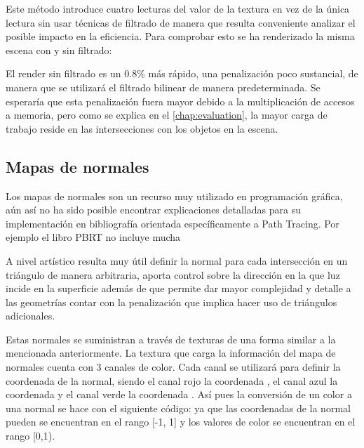 Este método introduce cuatro lecturas del valor de la textura en vez de la única lectura sin usar técnicas de filtrado de manera que resulta conveniente analizar el posible impacto en la eficiencia. Para comprobar esto se ha renderizado la misma escena con y sin filtrado:

		

	
El render sin filtrado es un 0.8\% más rápido, una penalización poco sustancial, de manera que se utilizará el filtrado bilinear de manera predeterminada. Se esperaría que esta penalización fuera mayor debido a la multiplicación de accesos a memoria, pero como se explica en el \autoref{chap:evaluation}, la mayor carga de trabajo reside en las intersecciones con los objetos en la escena.
	
\subsection{Mapas de normales}
	
Los mapas de normales son un recurso muy utilizado en programación gráfica, aún así no ha sido posible encontrar explicaciones detalladas para su implementación en bibliografía orientada específicamente a Path Tracing. Por ejemplo el libro PBRT\cite{pharr2016physically} no incluye mucha
	
A nivel artístico resulta muy útil definir la normal para cada intersección en un triángulo de manera arbitraria, aporta control sobre la dirección en la que luz incide en la superficie además de que permite dar mayor complejidad y detalle a las geometrías contar con la penalización que implica hacer uso de triángulos adicionales. 
	
Estas normales se suministran a través de texturas de una forma similar a la mencionada anteriormente. La textura que carga la información del mapa de normales cuenta con 3 canales de color. Cada canal se utilizará para definir la coordenada de la normal, siendo el canal rojo la coordenada , el canal azul la coordenada  y el canal verde la coordenada . Así pues la conversión de un color a una normal se hace con el siguiente código:  ya que las coordenadas de la normal pueden se encuentran en el rango [-1, 1] y los valores de color se encuentran en el rango [0,1).
	

